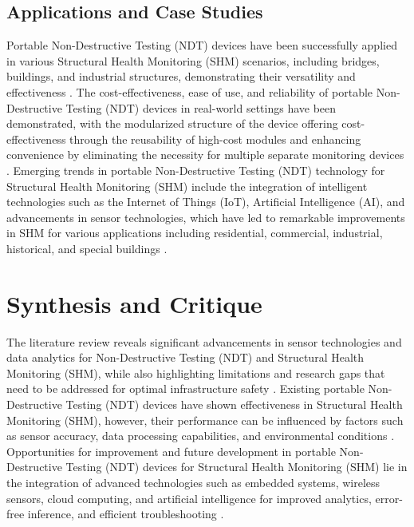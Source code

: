 \documentclass[journal, a4paper]{IEEEtran}
\begin{document}
\subsection{Applications and Case Studies}
Portable Non-Destructive Testing (NDT) devices have been successfully applied in various Structural Health Monitoring (SHM)
scenarios, including bridges, buildings, and industrial structures, demonstrating their versatility and effectiveness \cite{Parsy2018} \cite{Azimi2020}.
The cost-effectiveness, ease of use, and reliability of portable Non-Destructive Testing (NDT)
devices in real-world settings have been demonstrated, with the modularized structure of the device offering
cost-effectiveness through the reusability of high-cost modules and enhancing convenience by eliminating the
necessity for multiple separate monitoring devices \cite{Lee2023}.
Emerging trends in portable Non-Destructive Testing (NDT) technology for Structural Health Monitoring (SHM)
include the integration of intelligent technologies such as the Internet of Things (IoT), Artificial Intelligence (AI),
and advancements in sensor technologies, which have led to remarkable improvements in SHM for various applications
including residential, commercial, industrial, historical, and special buildings \cite{Vijayan2023} \cite{Hassani2023}. 


\section{Synthesis and Critique}
The literature review reveals significant advancements in sensor technologies and data analytics
for Non-Destructive Testing (NDT) and Structural Health Monitoring (SHM),
while also highlighting limitations and research gaps that need to be addressed for optimal infrastructure safety \cite{Vijayan2023} \cite{Hassani2023}.
Existing portable Non-Destructive Testing (NDT) devices have shown effectiveness in Structural Health Monitoring (SHM),
however, their performance can be influenced by factors such as sensor accuracy, data processing capabilities,
and environmental conditions \cite{Vijayan2023} \cite{Hassani2023}.
Opportunities for improvement and future development in portable Non-Destructive Testing (NDT) devices
for Structural Health Monitoring (SHM) lie in the integration of advanced technologies such as embedded systems,
wireless sensors, cloud computing, and artificial intelligence for improved analytics, error-free inference,
and efficient troubleshooting \cite{Meier2018}.
\end{document}

